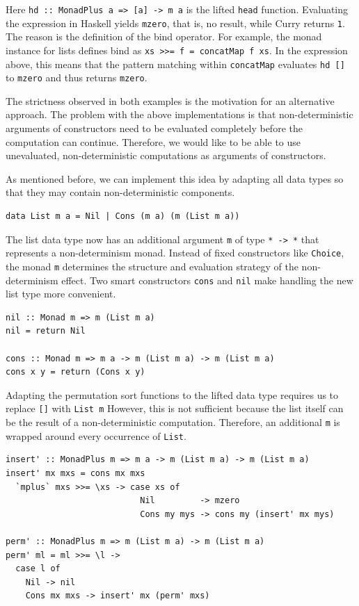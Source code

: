 \documentclass[a4paper, 11pt, fleqn, twoside]{scrreprt}
\newcommand{\hinl}[1]{\texttt{#1}}
\begin{document}
Here \hinl{hd :: MonadPlus a => [a] -> m a} is the lifted \hinl{head} function.
Evaluating the expression in Haskell yields \hinl{mzero}, that is, no result, while Curry returns \hinl{1}.
The reason is the definition of the bind operator.
For example, the monad instance for lists defines bind as \hinl{xs >>= f = concatMap f xs}.
In the expression above, this means that the pattern matching within \hinl{concatMap} evaluates \hinl{hd []} to \hinl{mzero} and thus returns \hinl{mzero}.

The strictness observed in both examples is the motivation for an alternative approach.
The problem with the above implementations is that non-deterministic arguments of constructors need to be evaluated completely before the computation can continue.
Therefore, we would like to be able to use unevaluated, non-deterministic computations as arguments of constructors.

As mentioned before, we can implement this idea by adapting all data types so that they may contain non-deterministic components.

\begin{verbatim}
data List m a = Nil | Cons (m a) (m (List m a))
\end{verbatim}

The list data type now has an additional argument \hinl{m} of type \hinl{* -> *} that represents a non-determinism monad.
Instead of fixed constructors like \hinl{Choice}, the monad \hinl{m} determines the structure and evaluation strategy of the non-determinism effect.
Two smart constructors \hinl{cons} and \hinl{nil} make handling the new list type more convenient.

\begin{verbatim}
nil :: Monad m => m (List m a)
nil = return Nil

cons :: Monad m => m a -> m (List m a) -> m (List m a)
cons x y = return (Cons x y)
\end{verbatim}

Adapting the permutation sort functions to the lifted data type requires us to replace \hinl{[]} with \hinl{List m} 
However, this is not sufficient because the list itself can be the result of a non-deterministic computation.
Therefore, an additional \hinl{m} is wrapped around every occurrence of \hinl{List}.

\begin{verbatim}
insert' :: MonadPlus m => m a -> m (List m a) -> m (List m a)
insert' mx mxs = cons mx mxs
  `mplus` mxs >>= \xs -> case xs of
                           Nil         -> mzero
                           Cons my mys -> cons my (insert' mx mys)

perm' :: MonadPlus m => m (List m a) -> m (List m a)
perm' ml = ml >>= \l ->
  case l of
    Nil -> nil
    Cons mx mxs -> insert' mx (perm' mxs)
\end{verbatim}
\end{document}
